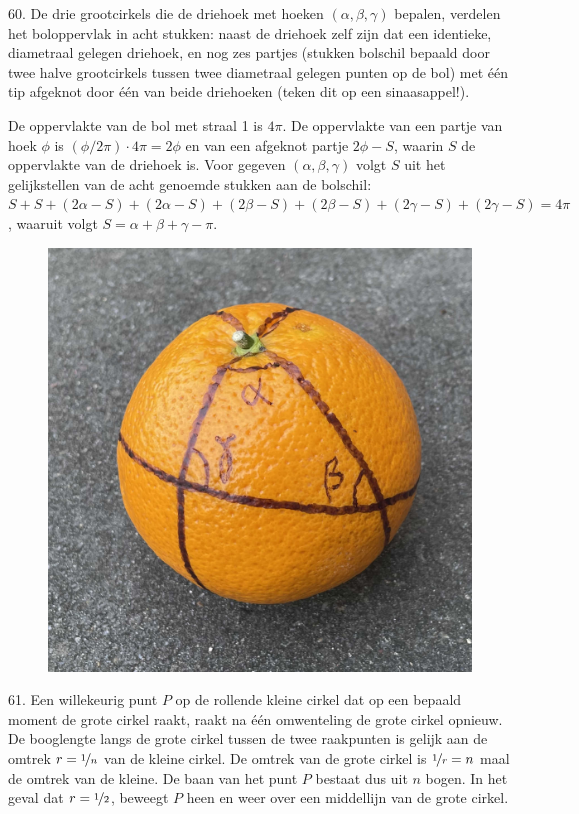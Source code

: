 \clearpage

\begin{problem}{60.}
	De drie grootcirkels die de driehoek met hoeken $(\alpha,\beta,\gamma)$ bepalen, verdelen het boloppervlak in acht stukken: naast de driehoek zelf zijn dat een identieke, diametraal gelegen driehoek, en nog zes partjes (stukken bolschil bepaald door twee halve grootcirkels tussen twee diametraal gelegen punten op de bol) met één tip afgeknot door één van beide driehoeken (teken dit op een sinaasappel!).

    De oppervlakte van de bol met straal 1 is $4 \pi$. De oppervlakte van een partje van hoek $\phi$ is $(\phi / 2 \pi) \cdot 4 \pi = 2 \phi$ en van een afgeknot partje $2 \phi - S$, waarin $S$ de oppervlakte van de driehoek is. Voor gegeven $(\alpha,\beta,\gamma)$ volgt $S$ uit het gelijkstellen van de acht genoemde stukken aan de bolschil: $S + S + (2 \alpha - S) + (2 \alpha - S) + (2 \beta - S) + (2 \beta - S) + (2 \gamma - S) + (2 \gamma - S) = 4 \pi$, waaruit volgt $S = \alpha + \beta + \gamma - \pi$.
    \begin{figure}
		\includegraphics[scale=0.3]{resources/oplossing60}
	\end{figure}
\end{problem}

\begin{problem}{61.}
    Een willekeurig punt $P$ op de rollende kleine cirkel dat op een bepaald moment de grote cirkel raakt, raakt na één omwenteling de grote cirkel opnieuw. De booglengte langs de grote cirkel tussen de twee raakpunten is gelijk aan de omtrek $r = \nicefrac{1}{n}$ van de kleine cirkel. De omtrek van de grote cirkel is $\nicefrac{1}{r} = n$ maal de omtrek van de kleine. De baan van het punt $P$ bestaat dus uit $n$ bogen. In het geval dat $r = \nicefrac{1}{2}$, beweegt $P$ heen en weer over een middellijn van de grote cirkel.
\end{problem}

